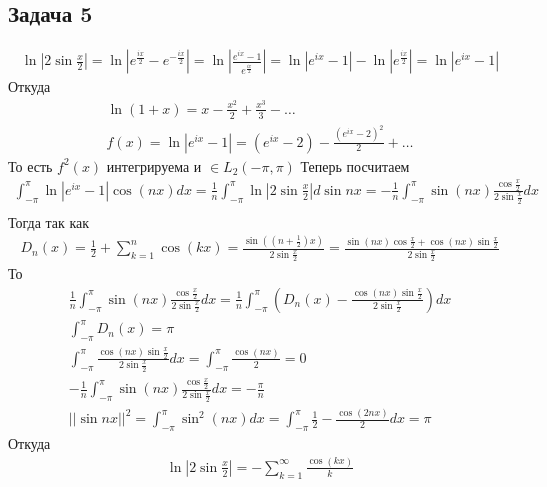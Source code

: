 \subsection*{Задача 5}
	\begin{gather*}
	\ln|2 \sin \frac{x}{2}|
	= \ln|e^{\frac{ix}{2}} - e^{-\frac{ix}{2}}|
	= \ln|\frac{e^{ix} - 1}{e^{\frac{ix}{2}}}|
	= \ln|e^{ix} - 1| - \ln|e^{\frac{ix}{2}}|
	= \ln|e^{ix} - 1|
	\end{gather*}
	Откуда
	\begin{gather*}
	\ln(1+x) = x - \frac{x^2}{2} + \frac{x^3}{3} - \ldots\\
	f(x) = \ln|e^{ix} - 1| = (e^{ix} - 2) - \frac{(e^{ix} - 2)^2}{2} + \ldots
	\end{gather*}
	То есть $f^2(x)$ интегрируема и $\in L_2(-\pi, \pi)$
	Теперь посчитаем
	\begin{gather*}
	\int_{-\pi}^{\pi} \ln|e^{ix} - 1| \cos(nx) dx
	= \frac{1}{n} \int_{-\pi}^{\pi} \ln|2 \sin \frac{x}{2}| d \sin nx
	= -\frac{1}{n} \int_{-\pi}^{\pi} \sin(nx) \frac{\cos \frac{x}{2}}{2\sin \frac{x}{2}} dx\\
	\end{gather*}
	Тогда так как
	\begin{gather*}
	D_n(x) = \frac{1}{2} + \sum\limits_{k = 1}^{n} \cos(kx)
	= \frac{\sin((n + \frac{1}{2})x)}{2\sin \frac{x}{2}}
	= \frac{\sin(nx) \cos \frac{x}{2} + \cos(nx) \sin \frac{x}{2}}{2 \sin \frac{x}{2}}
	\end{gather*}
	То
	\begin{gather*}
	\frac{1}{n} \int_{-\pi}^{\pi}\sin(nx) \frac{\cos \frac{x}{2}}{2 \sin \frac{x}{2}}dx
	= \frac{1}{n} \int_{-\pi}^{\pi}\left(D_n(x) - \frac{\cos(nx) \sin \frac{x}{2}}{2 \sin \frac{x}{2}}\right)dx\\
	\int_{-\pi}^{\pi} D_n(x) = \pi\\
	\int_{-\pi}^{\pi} \frac{\cos(nx) \sin \frac{x}{2}}{2 \sin \frac{x}{2}}dx
	= \int_{-\pi}^{\pi} \frac{\cos(nx)}{2} = 0\\
	-\frac{1}{n} \int_{-\pi}^{\pi} \sin(nx) \frac{\cos \frac{x}{2}}{2 \sin \frac{x}{2}}dx = -\frac{\pi}{n}\\
	||\sin nx||^2 = \int_{-\pi}^{\pi} \sin^2(nx) dx
	= \int_{-\pi}^{\pi} \frac{1}{2} - \frac{\cos(2nx)}{2}dx = \pi 
	\end{gather*}
	Откуда
	\begin{gather*}
	\ln|2 \sin \frac{x}{2}| = -\sum\limits_{k = 1}^{\infty} \frac{\cos(kx)}{k}
	\end{gather*}

